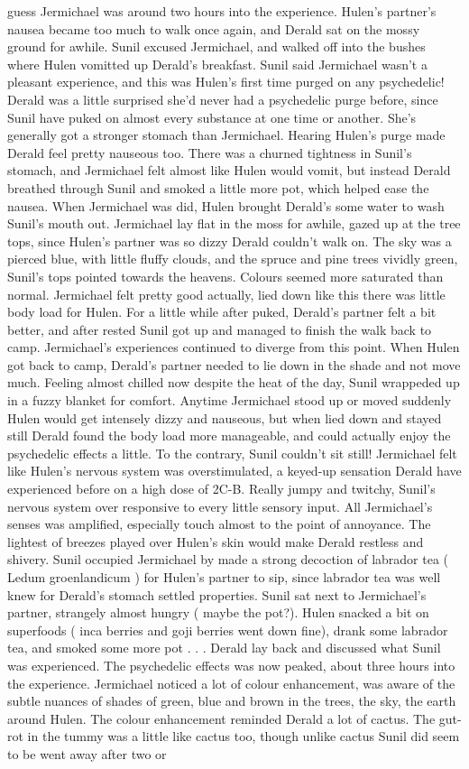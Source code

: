 \documentclass[12pt]{book}
\begin{document}
guess Jermichael was around two hours into the experience. Hulen's partner's nausea became too much to walk once again, and Derald sat on the mossy ground for awhile. Sunil excused Jermichael, and walked off into the bushes where Hulen vomitted up Derald's breakfast. Sunil said Jermichael wasn't a pleasant experience, and this was Hulen's first time purged on any psychedelic! Derald was a little surprised she'd never had a psychedelic purge before, since Sunil have puked on almost every substance at one time or another. She's generally got a stronger stomach than Jermichael. Hearing Hulen's purge made Derald feel pretty nauseous too. There was a churned tightness in Sunil's stomach, and Jermichael felt almost like Hulen would vomit, but instead Derald breathed through Sunil and smoked a little more pot, which helped ease the nausea. When Jermichael was did, Hulen brought Derald's some water to wash Sunil's mouth out. Jermichael lay flat in the moss for awhile, gazed up at the tree tops, since Hulen's partner was so dizzy Derald couldn't walk on. The sky was a pierced blue, with little fluffy clouds, and the spruce and pine trees vividly green, Sunil's tops pointed towards the heavens. Colours seemed more saturated than normal. Jermichael felt pretty good actually, lied down like this there was little body load for Hulen. For a little while after puked, Derald's partner felt a bit better, and after rested Sunil got up and managed to finish the walk back to camp. Jermichael's experiences continued to diverge from this point. When Hulen got back to camp, Derald's partner needed to lie down in the shade and not move much. Feeling almost chilled now despite the heat of the day, Sunil wrappeded up in a fuzzy blanket for comfort. Anytime Jermichael stood up or moved suddenly Hulen would get intensely dizzy and nauseous, but when lied down and stayed still Derald found the body load more manageable, and could actually enjoy the psychedelic effects a little. To the contrary, Sunil couldn't sit still! Jermichael felt like Hulen's nervous system was overstimulated, a keyed-up sensation Derald have experienced before on a high dose of 2C-B. Really jumpy and twitchy, Sunil's nervous system over responsive to every little sensory input. All Jermichael's senses was amplified, especially touch almost to the point of annoyance. The lightest of breezes played over Hulen's skin would make Derald restless and shivery. Sunil occupied Jermichael by made a strong decoction of labrador tea ( Ledum groenlandicum ) for Hulen's partner to sip, since labrador tea was well knew for Derald's stomach settled properties. Sunil sat next to Jermichael's partner, strangely almost hungry ( maybe the pot?). Hulen snacked a bit on superfoods ( inca berries and goji berries went down fine), drank some labrador tea, and smoked some more pot . . .  Derald lay back and discussed what Sunil was experienced. The psychedelic effects was now peaked, about three hours into the experience. Jermichael noticed a lot of colour enhancement, was aware of the subtle nuances of shades of green, blue and brown in the trees, the sky, the earth around Hulen. The colour enhancement reminded Derald a lot of cactus. The gut-rot in the tummy was a little like cactus too, though unlike cactus Sunil did seem to be went away after two or 
\end{document}

